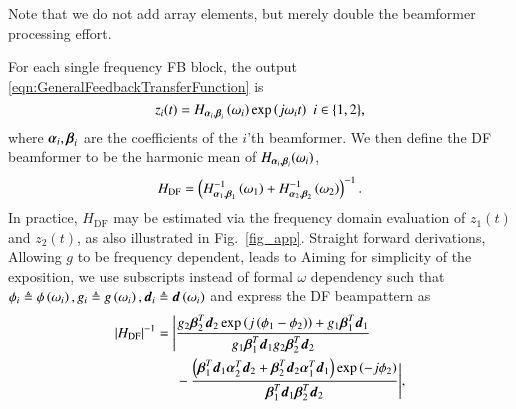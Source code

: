 Note that we do not add array elements, but merely double the beamformer processing effort. 
\par For each single frequency FB block, the output \eqref{eqn:GeneralFeedbackTransferFunction} is
\[
z_{i}(t)=H_{\vAlphaI{i},\vBetaI{i}}\rBrace{\omega_{i}}\exp{\rBrace{j\omega_{i}t}}\ \ {i\in\cBrace{1,2}},
\]
where $\boldsymbol{\alpha}_{i},\boldsymbol{\beta}_{i}$ are the coefficients of the $i$'th beamformer. 
We then define the DF beamformer to be the harmonic mean of $H_{\boldsymbol{\alpha}_{i},\boldsymbol{\beta}_{i}}(\omega_i)$,
\begin{equation*}
    H_{\text{DF}} = \left({H^{-1}_{\boldsymbol{\alpha}_{1},\boldsymbol{\beta}_{1}}\left({\omega_{1}}\right)+H^{-1}_{\boldsymbol{\alpha}_{2},\boldsymbol{\beta}_{2}}\left({\omega_{2}}\right)}\right)^{-1}.
\end{equation*}
In practice, $H_{\text{DF}}$ may be estimated via the frequency domain evaluation of $z_1(t)$ and $z_2(t)$, as also illustrated in Fig.~\ref{fig_app}.
\ifdefined\useOmega
Straight forward derivations, Allowing $g$ to be frequency dependent, leads to
\else
Aiming for simplicity of the exposition, we use subscripts instead of formal $\omega$ dependency such that $\phi_{i}\triangleq\phi\left({\omega_{i}}\right), g_{i}\triangleq{}g\left({\omega_{i}}\right), \boldsymbol{d}_{i}\triangleq\boldsymbol{d}\left({\omega_{i}}\right)$ and express the DF beampattern as
\fi
\begin{equation*}
    \centering
    \ifdefined\useOmega
    \resizebox{1\linewidth}{!}{
    \fi
        \begin{split}
            \lBrace{H_{\text{DF}}}^{-1}
            =
            \Bigg{|}
            &\frac
            {
            \gI{2}\vBetaTI{2}\vdI{2}\exp{\rBrace{j\rBrace{\phiI{1}-\phiI{2}}}}+\gI{1}\vBetaTI{1}\vdI{1}
            }{
            \gI{1}\vBetaTI{1}\vdI{1}\gI{2}\vBetaTI{2}\vdI{2}
            }
            \\&-
            \frac
            {
            \rBrace{\vBetaTI{1}\vdI{1}\vAlphaTI{2}\vdI{2}+\vBetaTI{2}\vdI{2}\vAlphaT_{1}\vdI{1}}\exp{\rBrace{-j\phiI{2}}}
            }{
            \vBetaTI{1}\vdI{1}\vBetaTI{2}\vdI{2}
            }
            \Bigg{|},
        \end{split}
    \ifdefined\useOmega
    }
    \fi
\end{equation*}
\ifdefined\useOmega
\fi
